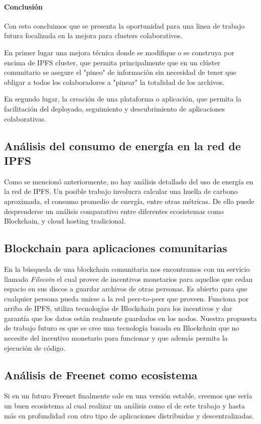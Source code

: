 \paragraph{Conclusión}

Con esto concluimos que se presenta la oportunidad para una linea de trabajo futura focalizada en la mejora para clusters colaborativos. 

En primer lugar una mejora técnica donde se modifique o se construya por encima de IPFS cluster, que permita principalmente que en un clúster comunitario se asegure el "pineo" de información sin necesidad de tener que obligar a todos los colaboradores a "pinear" la totalidad de los archivos.

En segundo lugar, la creación de una plataforma o aplicación, que permita la facilitación del deployado, seguimiento y descubrimiento de aplicaciones colaborativas.

\subsection{Análisis del consumo de energía en la red de IPFS}

Como se mencionó anteriormente, no hay análisis detallado del uso de energía en la red de IPFS. Un posible trabajo involucra calcular una huella de carbono aproximada, el consumo promedio de energía, entre otras métricas. De ello puede desprenderse un análisis comparativo entre diferentes ecosistemas como Blockchain, y cloud hosting tradicional.

\subsection{Blockchain para aplicaciones comunitarias}

En la búsqueda de una blockchain comunitaria nos encontramos con un servicio llamado \textit{Filecoin}\cite{filecoin} el cual provee de incentivos monetarios para aquellos que cedan espacio en sus discos a guardar archivos de otras personas. Es abierto para que cualquier persona pueda unirse a la red peer-to-peer que proveen. Funciona por arriba de IPFS, utiliza tecnologías de Blockchain para los incentivos y dar garantía que los datos están realmente guardados en los nodos. Nuestra propuesta de trabajo futuro es que se cree una tecnología basada en Blockchain que no necesite del incentivo monetario para funcionar y que además permita la ejecución de código.

\subsection{Análisis de Freenet como ecosistema}

Si en un futuro Freenet finalmente sale en una versión estable, creemos que sería un buen ecosistema al cual realizar un análisis como el de este trabajo y hasta más en profundidad con otro tipo de aplicaciones distribuidas y descentralizadas.

